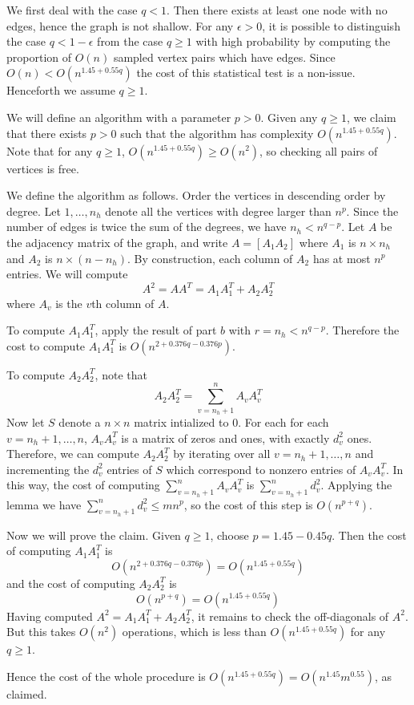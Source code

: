 \documentclass[11pt]{article}
\begin{document}
We first deal with the case $q < 1$.  Then there exists at least one
node with no edges, hence the graph is not shallow.  For any $\epsilon
> 0$, it is possible to distinguish the case $q < 1 - \epsilon$ from
the case $q \geq 1$ with high probability by computing the proportion
of $O(n)$ sampled vertex pairs which have edges.  Since $O(n) <
O(n^{1.45 + 0.55q})$ the cost of this statistical test is a non-issue.
Henceforth we assume $q \geq 1$.

We will define an algorithm with a parameter $p > 0$.  Given any $q
\geq 1$, we claim that there exists $p > 0$ such that the algorithm
has complexity $O(n^{1.45 + 0.55q})$.  Note that for any $q \geq 1$,
$O(n^{1.45 + 0.55q}) \geq O(n^2)$, so checking all pairs of vertices
is free.

We define the algorithm as follows.  Order the vertices in descending
order by degree.  Let $1,\hdots, n_h$ denote all the vertices with
degree larger than $n^p$.  Since the number of edges is twice the sum
of the degrees, we have $n_h < n^{q-p}$.  Let $A$ be the adjacency
matrix of the graph, and write $A = [A_1 A_2]$ where $A_1$ is $n
\times n_h$ and $A_2$ is $n \times (n-n_h)$.  By construction, each
column of $A_2$ has at most $n^p$ entries.  We will compute
\[
A^2 = AA^T = A_1 A_1^T + A_2 A_2^T
\]
where $A_v$ is the $v$th column of $A$.

To compute $A_1 A_1^T$, apply the result of part $b$ with $r = n_h <
n^{q-p}$.  Therefore the cost to compute $A_1 A_1^T$ is
$O(n^{2 +0.376q-0.376p})$.

To compute $A_2 A_2^T$, note that
\[A_2 A_2^T = \sum_{v = n_h + 1}^n A_v A_v^T\]
Now let $S$ denote a $n \times n$ matrix intialized to $0$.  For each
for each $v = n_h+1,\hdots, n$, $A_v A_v^T$ is a matrix of zeros and
ones, with exactly $d_v^2$ ones.  Therefore, we can compute $A_2
A_2^T$ by iterating over all $v = n_h + 1,\hdots, n$ and incrementing
the $d_v^2$ entries of $S$ which correspond to nonzero entries of $A_v
A_v^T$.  In this way, the cost of computing $\sum_{v = n_h + 1}^n A_v
A_v^T$ is $\sum_{v = n_h + 1}^n d_v^2$.  Applying the lemma we have
$\sum_{v = n_h + 1}^n d_v^2 \leq m n^p$, so the cost of this step is
$O(n^{p+q})$.

Now we will prove the claim. Given $q \geq 1$, choose $p = 1.45 - 0.45 q$.
Then the cost of computing $A_1 A_1^T$ is 
\[
O(n^{2 + 0.376q-0.376p}) = O(n^{1.45 + 0.55 q})
\]
and the cost of computing $A_2 A_2^T$ is
\[
O(n^{p + q}) = O(n^{1.45 + 0.55q})
\]
Having computed $A^2 = A_1 A_1^T + A_2 A_2^T$, it remains to check the
off-diagonals of $A^2$.  But this takes $O(n^2)$ operations, which is
less than $O(n^{1.45 + 0.55q})$ for any $q \geq 1$.

Hence the cost of the whole procedure is $O(n^{1.45 + 0.55q}) =
O(n^{1.45} m^{0.55})$, as claimed.
\end{document}
